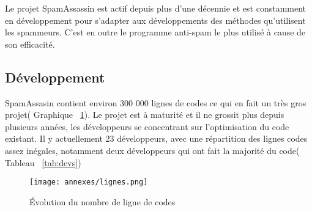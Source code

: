 \documentclass[a4paper,11pt]{article}
\begin{document}
Le projet SpamAssassin est actif depuis plus d'une décennie et est constamment en développement 
pour s'adapter aux développements des méthodes qu'utilisent les spammeurs. C'est en outre le programme anti-spam le plus utilisé à cause de son efficacité.

\subsection{Développement}

SpamAssasin contient environ 300 000 lignes de codes ce qui en fait un très gros projet( Graphique ~\ref{fig:code}).
Le projet est à maturité et il ne grossit plus depuis plusieurs années, les développeurs se concentrant sur l'optimisation du code existant.
Il y actuellement 23 développeurs, avec une répartition des lignes codes assez inégales, notamment deux développeurs qui ont fait la majorité du code( Tableau ~\ref{tab:devs})

\begin{figure}
 \texttt{[image: annexes/lignes.png]}
  \caption{Évolution du nombre de ligne de codes}
  \label {fig:code}
\end{figure}
\end{document}
